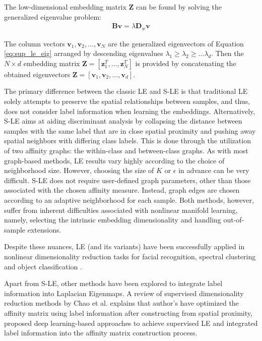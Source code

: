 The low-dimensional embedding matrix $\bm{Z}$ can be found by solving the generalized eigenvalue problem:
\begin{align}
	\bm{B}\bm{v} = \lambda \bm{D}_{w}\bm{v} \label{eq:sup_le_eig}
\end{align}

The column vectors $\bm{v}_{1}, \bm{v}_{2}, \dots, \bm{v}_{N}$ are the generalized eigenvectors of 
Equation \ref{eq:sup_le_eig} arranged by descending eigenvalues $\lambda_{1} \geq \lambda_{2} \geq \dots \lambda_{d}$.  Then the $N \times d$ embedding matrix $\bm{Z} =  [ \bm{z}^{T}_{1}, \dots, \bm{z}^{T}_{N}]$ is provided by concatenating the obtained eigenvectors $\bm{Z} = [\bm{v}_{1}, \bm{v}_{2}, \dots, \bm{v}_{d}]$.

The primary difference between the classic LE and S-LE is that traditional LE solely attempts to preserve the spatial relationships between samples, and thus, does not consider label information when learning the embeddings.  Alternatively, S-LE aims at aiding discriminant analysis by collapsing the distance between samples with the same label that are in close spatial proximity and pushing away spatial neighbors with differing class labels.  This is done through the utilization of two affinity graphs: the within-class and between-class graphs.  As with most graph-based methods, LE results vary highly according to the choice of neighborhood size.  However, choosing the size of $K$ or $\epsilon$ in advance can be very difficult. S-LE does not require user-defined graph parameters, other than those associated with the chosen affinity measure.  Instead, graph edges are chosen according to an adaptive neighborhood for each sample.   Both methods, however, suffer from inherent difficulties associated with nonlinear manifold learning, namely, selecting the intrinsic embedding dimensionality and handling out-of-sample extensions.

Despite these nuances, LE (and its variants) have been successfully applied in nonlinear dimensionality reduction tasks for facial recognition, spectral clustering and object classification \cite{VanDerMaaten2009DRReview}.

Apart from S-LE, other methods have been explored to integrate label information into Laplacian Eigenmaps.  A review of supervised dimensionality reduction methods by Chao et al. \citep{Chao2019RecentAdvancesSupervisedDimRed} explains that author's have optimized the affinity matrix using label information after constructing from spatial proximity, proposed deep learning-based approaches to achieve supervised LE and integrated label information into the affinity matrix construction process.  

